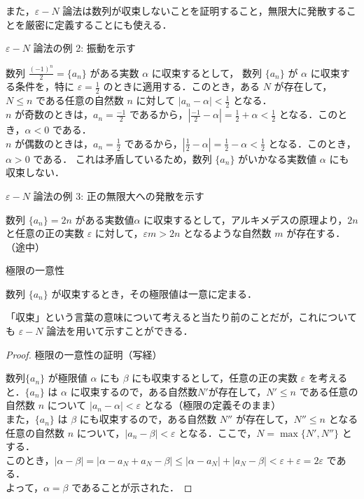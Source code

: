 \documentclass[a4paper]{ltjsarticle}
\begin{document}
また，$\varepsilon - N$ 論法は数列が収束しないことを証明すること，無限大に発散することを厳密に定義することにも使える．
\begin{tcb}{$ \varepsilon - N$ 論法の例 2: 振動を示す}{}

数列 $\frac{(-1)^n}{2} = \{a_n\}$ がある実数 $\alpha$ に収束するとして，
数列 $\{a_n\}$ が $\alpha$ に収束する条件を，特に $\varepsilon = \frac{1}{2}$ のときに適用する．このとき，ある $N$ が存在して，$N \leq n$ である任意の自然数 $n$ に対して $|a_n - \alpha| < \frac{1}{2}$ となる．
\\
$n$ が奇数のときは，$a_n = \frac{-1}{2}$ であるから，$|\frac{-1}{2} - \alpha| = \frac{1}{2} + \alpha < \frac{1}{2}$ となる．このとき，$\alpha < 0$ である．
\\
$n$ が偶数のときは，$a_n = \frac{1}{2}$ であるから，$|\frac{1}{2} - \alpha| = \frac{1}{2} - \alpha < \frac{1}{2}$ となる．このとき，$\alpha > 0$ である．
これは矛盾しているため，数列 $\{a_n\}$ がいかなる実数値 $\alpha$ にも収束しない．

\end{tcb}

\begin{tcb}{$ \varepsilon - N$ 論法の例 3: 正の無限大への発散を示す}{}

数列 $\{a_n\} = 2n$ がある実数値$ \alpha$ に収束するとして，アルキメデスの原理より，$2n$ と任意の正の実数 $\varepsilon$ に対して，$\varepsilon m > 2n$ となるような自然数 $m$ が存在する． （途中）

\end{tcb}

\begin{theorem}{極限の一意性}{}

数列 $\{a_n\}$ が収束するとき，その極限値は一意に定まる．

\end{theorem}

「収束」という言葉の意味について考えると当たり前のことだが，これについても $\varepsilon - N$ 論法を用いて示すことができる．

\pagebreak

\begin{proof}{極限の一意性の証明（写経）}{}

数列$\{a_n\}$ が極限値 $\alpha$ にも $\beta$ にも収束するとして，任意の正の実数 $\varepsilon$ を考えると．$\{a_n\}$ は $\alpha$ に収束するので，ある自然数$N'$が存在して，$N' \leq n$ である任意の自然数 $n$ について $|a_n - \alpha| < \varepsilon$ となる（極限の定義そのまま）
\\
また，$\{a_n\}$ は $\beta$ にも収束するので，ある自然数 $N''$ が存在して，$N'' \leq  n$ となる任意の自然数 $n$ について，$|a_n - \beta| < \varepsilon$ となる．ここで，$N = \max \{ N', N''\}$ とする．
\\
このとき，$|\alpha - \beta| = |\alpha - a_N + a_N - \beta| \leq |\alpha - a_N| + |a_N - \beta| < \varepsilon + \varepsilon = 2\varepsilon$ である．
\\
よって，$\alpha = \beta$ であることが示された．

\end{proof}
\end{document}

